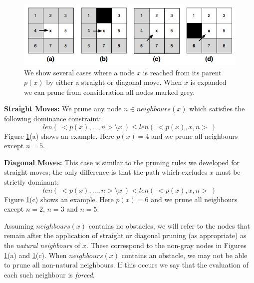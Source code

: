 \begin{figure}[h]
       \begin{center}
		   \includegraphics[scale=0.4, trim = 10mm 10mm 10mm 0mm]
			{diagrams/pruningrules.png}
       \end{center}
	\vspace{-3pt}
       \caption{We show several cases where a node $x$ is reached from its
parent $p(x)$ by either a straight or diagonal move. When $x$ is expanded we can
prune from consideration all nodes marked grey.}
       \label{fig:pruning}
\end{figure}
\par \noindent
\textbf{Straight Moves:} We prune any node $n \in neighbours(x)$ which 
satisfies the following dominance constraint:
\begin{equation}
len(~<p(x), \ldots, n> \setminus x~)
\leq len(~<p(x), x, n >~)
\end{equation}
Figure \ref{fig:pruning}(a) shows an example. Here $p(x) = 4$ and we prune
 all neighbours except $n = 5$.
\par \noindent
\textbf{Diagonal Moves:} This case is similar to the pruning rules we developed
for straight moves; the only difference is that the path which excludes $x$ must 
be strictly dominant: 
\begin{equation}
len(~<p(x), \ldots, n> \setminus x~) < len(~<p(x), x, n>~)
\end{equation}
Figure \ref{fig:pruning}(c) shows an example. Here $p(x) = 6$ and we prune all
neighbours except $n = 2$, $n = 3$ and $n = 5$.  
\par
Assuming $neighbours(x)$ contains no obstacles, we will refer to the nodes
that remain after the application of straight or diagonal pruning (as
appropriate) as the \emph{natural neighbours} of $x$. These correspond to the non-gray
nodes in Figures \ref{fig:pruning}(a) and \ref{fig:pruning}(c).
When $neighbours(x)$ contains an obstacle, we may not be able to prune
all non-natural neighbours. If this occurs we say that the evaluation of each
such neighbour is \emph{forced}.

